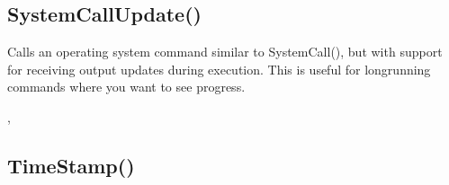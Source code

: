 \documentclass[letterpaper,10pt,english]{sphinxmanual}
\begin{document}
\sphinxAtStartPar
{}

\ignorespaces 

\subsection{SystemCallUpdate()}
\label{\detokenize{reference/peblenvironment:systemcallupdate}}\label{\detokenize{reference/peblenvironment:index-63}}
\sphinxAtStartPar
{}

\sphinxAtStartPar
{}

\sphinxAtStartPar
Calls an operating system command similar to SystemCall(), but with support for receiving output updates during execution. This is useful for long\sphinxhyphen{}running commands where you want to see progress.

\sphinxAtStartPar
{}

\begin{sphinxVerbatim}[commandchars=\\\{\}]
\end{sphinxVerbatim}

\sphinxAtStartPar
{}

\begin{sphinxVerbatim}[commandchars=\\\{\}]
\end{sphinxVerbatim}

\sphinxAtStartPar
{}

\sphinxAtStartPar
{}, 

\ignorespaces 

\subsection{TimeStamp()}
\label{\detokenize{reference/peblenvironment:timestamp}}\label{\detokenize{reference/peblenvironment:index-64}}
\sphinxAtStartPar
{}
\end{document}
